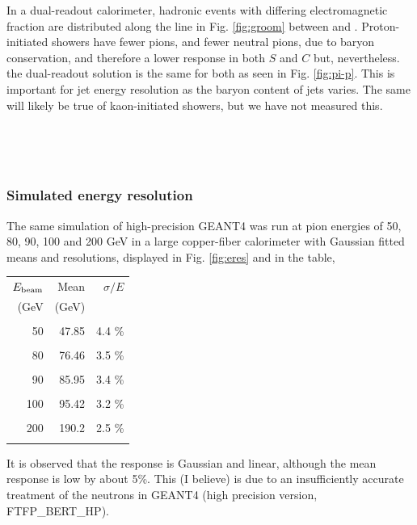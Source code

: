  In a dual-readout calorimeter, hadronic events with differing
electromagnetic fraction are distributed along the line in Fig. \ref{fig:groom} between  and .  Proton-initiated
showers have fewer pions, and  fewer neutral pions, due to baryon conservation, and  therefore a lower response in both $S$ and $C$ but,
nevertheless. the dual-readout solution is the same for both as seen in Fig. \ref{fig:pi-p}.  This is important for jet energy resolution as the baryon  
content of jets varies.  The same will likely be true of kaon-initiated showers, but we have not measured this. 




~~~~~~~~~~~~~~~~~~~~~~~~~~~~~~~~~~~~~~~~~~~~~

~~~~~~~~~~~~~~~~~~~~~~~~~~~~~~~~~~~~~~~~~~~~~

\subsubsection{Simulated energy resolution}                \label{sec:Eres}  

The same simulation of high-precision GEANT4 was run at pion energies of 50, 80, 90, 100 and 200 GeV in a large
copper-fiber calorimeter with Gaussian fitted  means and resolutions, displayed in Fig. \ref{fig:eres} and in the table,

\bigskip

\begin{tabular}{ r r r }
$E_{\rm beam}$   &  Mean         &  $\sigma/E$ \\
   (GeV    &   (GeV)       &   \\
\hline
 & & \\
 50    &    47.85   & 4.4 \% \\
 &&\\
 80   & 76.46     &  3.5 \% \\
 &&\\
 90  & 85.95    &   3.4 \% \\
 &&\\
 100  & 95.42  &  3.2 \% \\
 &&\\
 200  & 190.2  &  2.5 \% \\
 &&\\
 \end{tabular}

\bigskip

 It is observed that the response is Gaussian and linear, although the mean response is low by about 5\%.  This (I believe) is due to an insufficiently accurate treatment of the neutrons in GEANT4 (high precision version, FTFP\_BERT\_HP).


